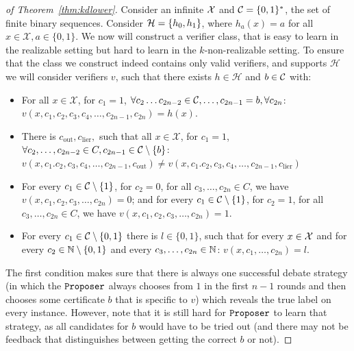\documentclass[anon]{alt2027} %
\begin{document}
\begin{proof}[of Theorem~\ref{thm:kdlower}]
    Consider an infinite ${\mathcal X}$ and ${{\mathcal C}} = \{0,1\}^*$, the set of finite binary sequences.  Consider ${{\mathcal H}} = \{h_0,h_1\}$, where $h_a(x) = a$ for all $x\in \mathcal{X}, a\in\{0,1\}$. 
    We now will construct a verifier class, that is easy to learn in the realizable setting but hard to learn in the $k$-non-realizable setting.
  To ensure that the class we construct indeed contains only valid  verifiers, and supports $\mathcal{H}$ we will consider verifiers $v$, such that there exists $h\in \mathcal{H}$ and $b\in {{\mathcal C}}$ with:
  \begin{itemize}
      \item For all $x \in \mathcal{X}$, for $c_1 =1$, $\forall c_2 \dots c_{2n-2}\in {{\mathcal C}}, \dots, c_{2n-1}= b, \forall c_{2n}  $: $v(x, c_1, c_2, c_3,c_4, \dots, c_{2n-1}, c_{2n}) = h(x) $.
      \item There is $c_{\mathrm{out}},c_{\mathrm{lier}}, $ such that all $x \in \mathcal{X}$, for $c_1 =1$, $\forall c_2, \dots, c_{2n-2} \in C,  c_{2n-1} \in {{\mathcal C}} \setminus \{b\}$: $v(x, c_1. c_2, c_3,c_4, \dots, c_{2n-1}, c_{\mathrm{out}}) \neq v(x, c_1. c_2, c_3,c_4, \dots, c_{2n-1}, c_{\mathrm{lier}}) $%
      \item For every $c_1 \in {{\mathcal C}} \setminus \{1\}$, for $c_2 = 0 $, for all $c_3, \dots, c_{2n} \in C$, we have $v(x,c_1, c_2, c_3, \dots, c_{2n}) = 0$; and for every $c_1 \in {{\mathcal C}} \setminus \{1\}$, for $c_2 = 1 $, for all $c_3, \dots, c_{2n} \in C$, we have $v(x,c_1, c_2, c_3, \dots, c_{2n}) = 1$. 
      \item For every $c_1\in {{\mathcal C}} \setminus \{0,1\}$ there is $l \in \{0,1\}$, such that for every $x\in{\mathcal X}$ and for every $c_2\in \mathbb{N} \setminus \{0,1\}$ and every $c_3, \dots, c_{2n} \in \mathbb{N}$: $v(x,c_1, \dots, c_{2n})= l $.
  \end{itemize}
    The first condition makes sure that there is always one successful debate strategy (in which the $\texttt{Proposer}$ always chooses from $1$ in the first $n-1$ rounds and then chooses some certificate $b$ that is specific to $v$) which reveals the true label on every instance. 
    However, note that it is still hard for $\texttt{Proposer}$ to learn that strategy, as all candidates for $b$ would have to be tried out (and there may not be feedback that distinguishes between getting the correct $b$ or not). 
    

\end{proof}
\end{document}
